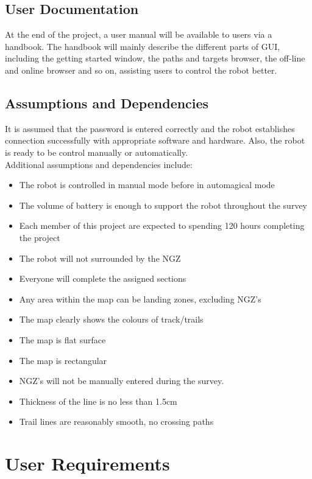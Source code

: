 \documentclass[10pt,a4paper,titlepage]{article}
\begin{document}
	\subsection{User Documentation}
	At the end of the project, a user manual will be available to users via a handbook. The handbook will mainly describe the different parts of GUI, including the getting started window, the paths and targets browser, the off-line and online browser and so on, assisting users to control the robot better.
	
	\subsection{Assumptions and Dependencies}
	
	It is assumed that the password is entered correctly and the robot establishes connection successfully with appropriate software and hardware. Also, the robot is ready to be control manually or automatically. \\ 

	Additional assumptions and dependencies include: 
	\begin{itemize}
		\item The robot is controlled in manual mode before in automagical mode
		\item The volume of battery is enough to support the robot throughout the survey
		\item Each member of this project are expected to spending 120 hours completing the project
		\item The robot will not surrounded by the NGZ
		\item Everyone will complete the assigned sections 
		\item Any area within the map can be landing zones, excluding NGZ's
		\item The map clearly shows the colours of track/trails
		\item The map is flat surface
		\item The map is rectangular
		\item NGZ's will not be manually entered during the survey.
		\item Thickness of the line is no less than 1.5cm
		\item Trail lines are reasonably smooth, no crossing paths
	\end{itemize}
	
		\section{User Requirements}
\end{document}
